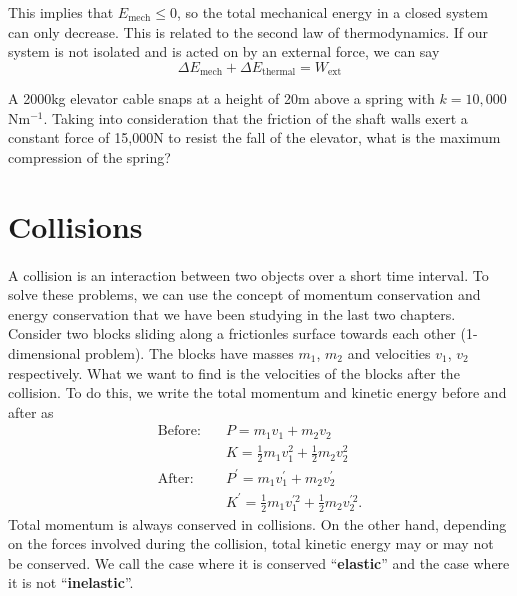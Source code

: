 \documentclass[../newtonian_mechanics.tex]{subfiles}
\begin{document}
        This implies that $E_\text{mech}\leq 0$, so the total mechanical energy in a closed system can only decrease.
        This is related to the second law of thermodynamics.
        If our system is not isolated and is acted on by an external force, we can say
        \begin{equation}
            \Delta E_\text{mech} + \Delta E_\text{thermal} = W_\text{ext}
        \end{equation}
        \begin{example}
            A 2000kg elevator cable snaps at a height of 20m above a spring with $k=10,000$Nm$^{-1}$.
            Taking into consideration that the friction of the shaft walls exert a constant force of 15,000N to resist the fall of the elevator, what is the maximum compression of the spring?
        \end{example}

    \section{Collisions}
        \paragraph{}
        A collision is an interaction between two objects over a short time interval.
        To solve these problems, we can use the concept of momentum conservation and energy conservation that we have been studying in the last two chapters.
        Consider two blocks sliding along a frictionles surface towards each other (1-dimensional problem).
        The blocks have masses $m_1$, $m_2$ and velocities $v_1$, $v_2$ respectively.
        What we want to find is the velocities of the blocks after the collision.
        To do this, we write the total momentum and kinetic energy before and after as
        \begin{align}
            \text{Before:}\quad& P=m_1v_1+m_2v_2\\
            & K=\frac{1}{2}m_1v_1^2+\frac{1}{2}m_2v_2^2\\
            \text{After:}\quad& P^\prime=m_1v_1^\prime+m_2v_2^\prime\\
            & K^\prime=\frac{1}{2}m_1v_1^{\prime 2}+\frac{1}{2}m_2v_2^{\prime 2}.
        \end{align}
        Total momentum is always conserved in collisions.
        On the other hand, depending on the forces involved during the collision, total kinetic energy may or may not be conserved.
        We call the case where it is conserved ``\textbf{elastic}'' and the case where it is not ``\textbf{inelastic}''. 
\end{document}
